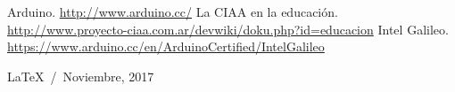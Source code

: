 \documentclass[a4paper]{article}
\begin{document}
\begin{thebibliography}{9}
   Arduino. \href{http://www.arduino.cc/}{http://www.arduino.cc/}
   La CIAA en la educación. \href{http://www.proyecto-ciaa.com.ar/devwiki/doku.php?id=educacion}{http://www.proyecto-ciaa.com.ar/devwiki/doku.php?id=educacion}
   Intel Galileo. \href{https://www.arduino.cc/en/ArduinoCertified/IntelGalileo}{https://www.arduino.cc/en/ArduinoCertified/IntelGalileo}
\end{thebibliography}

\vfill
\begin{flushright}
  \LaTeX~/~Noviembre, 2017
\end{flushright}
\end{document}
